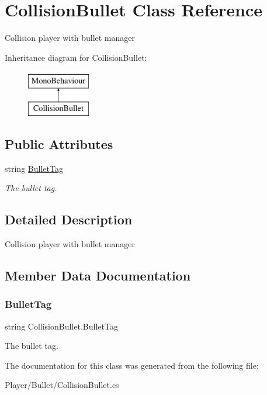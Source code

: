 \hypertarget{class_collision_bullet}{}\section{Collision\+Bullet Class Reference}
\label{class_collision_bullet}


Collision player with bullet manager  


Inheritance diagram for Collision\+Bullet\+:\begin{figure}[H]
\begin{center}
\leavevmode
\includegraphics[height=2.000000cm]{class_collision_bullet}
\end{center}
\end{figure}
\subsection*{Public Attributes}
\begin{DoxyCompactItemize}
\item 
string \mbox{\hyperlink{class_collision_bullet_a98c6bc7c9224385999fe1226cf3c1aee}{Bullet\+Tag}}
\begin{DoxyCompactList}\small\item\em The bullet tag. \end{DoxyCompactList}\end{DoxyCompactItemize}


\subsection{Detailed Description}
Collision player with bullet manager 



\subsection{Member Data Documentation}
\mbox{\label{class_collision_bullet_a98c6bc7c9224385999fe1226cf3c1aee}} 
\subsubsection{\texorpdfstring{Bullet\+Tag}{BulletTag}}
{\footnotesize\ttfamily string Collision\+Bullet.\+Bullet\+Tag}



The bullet tag. 



The documentation for this class was generated from the following file\+:\begin{DoxyCompactItemize}
\item 
Player/\+Bullet/Collision\+Bullet.\+cs\end{DoxyCompactItemize}
